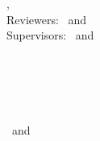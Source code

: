 \hfill
\vfill
{
	\small
	\textbf{\thesisName} \\
	\textit{\thesisTitle} \\
	\thesisSubject, \thesisDate \\
	Reviewers: \thesisFirstReviewer\ and \thesisSecondReviewer \\
	Supervisors: \thesisFirstSupervisor\ and \thesisSecondSupervisor \\[1.5em]
	\textbf{\thesisUniversity} \\
	\textit{\thesisUniversityGroup} \\
	\thesisUniversityInstitute \\
	\thesisUniversityDepartment \\
	\thesisUniversityStreetAddress \\
	\thesisUniversityPostalCode\ and \thesisUniversityCity
}
